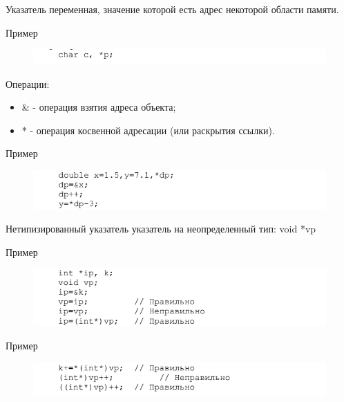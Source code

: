 \documentclass{beamer}
\begin{document}
\begin{frame}
\begin{block}{Указатель}
переменная, значение которой есть адрес некоторой области памяти.
\end{block}
Пример
\begin{figure}[h]
\centering
\includegraphics[scale=0.75]{images/lec03-pic20.png}
\end{figure}
Операции:
\begin{itemize}
\item \& - операция взятия адреса объекта;
\item * - операция косвенной адресации (или раскрытия ссылки).
\end{itemize}
Пример
\begin{figure}[h]
\centering
\includegraphics[scale=0.75]{images/lec03-pic21.png}
\end{figure}
\end{frame}

\begin{frame}
\begin{block}{Нетипизированный указатель}
указатель на неопределенный тип: void *vp
\end{block}
Пример
\begin{figure}[h]
\centering
\includegraphics[scale=0.75]{images/lec03-pic22.png}
\end{figure}
Пример
\begin{figure}[h]
\centering
\includegraphics[scale=0.75]{images/lec03-pic23.png}
\end{figure}
\end{frame}
\end{document}
